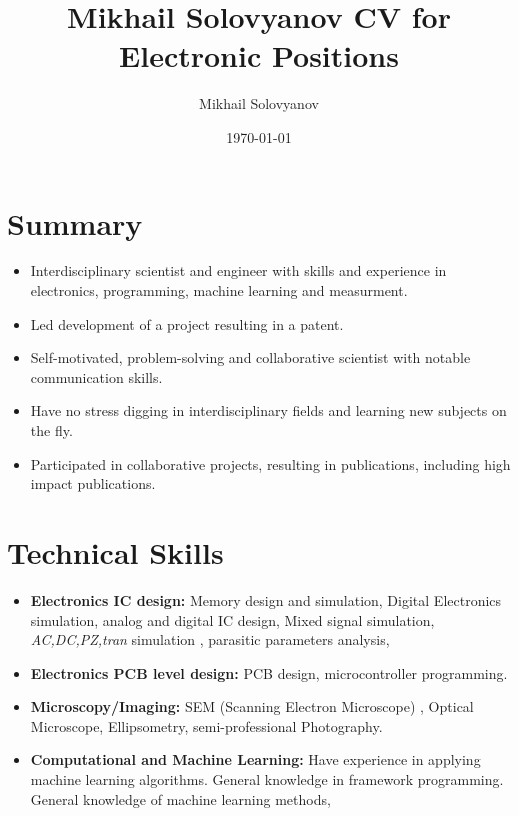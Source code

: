 \documentclass{article}
\title{ Mikhail Solovyanov CV for Electronic Positions}
\author{Mikhail Solovyanov}
\date{\today}
\begin{document}

\makecvtitle %

\section{Summary}
\begin{itemize}
\item Interdisciplinary scientist and engineer  with skills and experience in electronics, programming, machine learning and measurment. 

\item Led development of a  project resulting in a patent.
\item Self-motivated, problem-solving and collaborative scientist with notable communication skills.
\item Have no stress digging in interdisciplinary fields and learning new subjects on the fly.
\item Participated in collaborative projects, resulting in publications, including high impact publications.
\end{itemize}
 
\section{Technical Skills}

\begin{itemize}
\item \textbf{Electronics IC design:} Memory design and simulation, Digital Electronics simulation, analog and digital IC design, Mixed signal simulation, \textit{AC,DC,PZ,tran} simulation , parasitic parameters analysis, 
\item \textbf{Electronics PCB level design:} PCB design, microcontroller programming. 
\item \textbf{Microscopy/Imaging:} SEM (Scanning Electron Microscope) , Optical Microscope, Ellipsometry, semi-professional Photography.
\item \textbf{Computational and Machine Learning:} Have experience in applying machine learning algorithms. General knowledge in framework programming. General knowledge of machine learning methods, 
\end{itemize}
\end{document}
